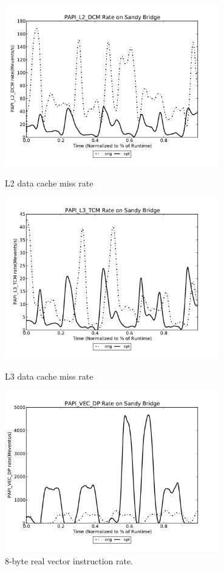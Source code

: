\begin{figure}
\centering
\begin{minipage}{1.\textwidth}
   \begin{center}
   \includegraphics[width=1.\linewidth,height=7cm]{figures/perfTestWACCM-PAPI_L2_DCM.pdf}
   \caption{L2 data cache miss rate}
   \label{fig:perfTestWACCM-L2}
   \end{center}
\end{minipage}
\begin{minipage}{1.\textwidth}
   \begin{center}
   \includegraphics[width=1.\linewidth,height=7cm]{figures/perfTestWACCM-PAPI_L3_TCM.pdf}
   \caption{L3 data cache miss rate}
   \label{fig:perfTestWACCM-L3}
   \end{center}
\end{minipage}
\begin{minipage}{1.\textwidth}
   \begin{center}
   \includegraphics[width=1.\linewidth,height=7cm]{figures/perfTestWACCM-PAPI_VEC_DP.pdf}
   \caption{8-byte real vector instruction rate.}
   \label{fig:perfTestWACCM-VEC}
   \end{center}
\end{minipage}
\end{figure}
